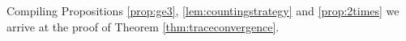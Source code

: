 \documentclass[12pt]{article}
\numberwithin{equation}{section}
\newtheorem{theorem}{Theorem}[section]
\numberwithin{equation}{section}
\theoremstyle{definition}
\renewcommand{\1}{\bf 1}
\begin{document}
%
%
%
%
%
%
%
%
Compiling Propositions \ref{prop:ge3}, \ref{lem:countingstrategy} and \ref{prop:2times} we arrive at the proof of Theorem \ref{thm:traceconvergence}. 
\end{document}
